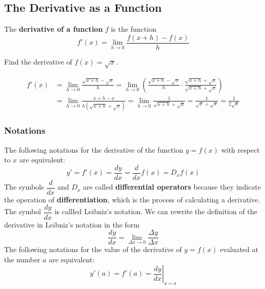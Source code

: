 \subsection{The Derivative as a Function}

\begin{definition}
    The \textbf{derivative of a function} \(f\) is the function
    \[f'(x)=\lim_{h\to 0}\frac{f(x+h)-f(x)}{h}\]
\end{definition}
\begin{problem}
    Find the derivative of \(f(x)=\sqrt{x}\).
\end{problem}
\begin{solution}
    \begin{align*}
        f'(x) &= \lim_{h\to 0}\frac{\sqrt{x+h}-\sqrt{x}}{h}=\lim_{h\to 0}
        \left(\frac{\sqrt{x+h}-\sqrt{x}}{h}\cdot
        \frac{\sqrt{x+h}+\sqrt{x}}{\sqrt{x+h}+\sqrt{x}}\right) \\
        &= \lim_{h\to 0}\frac{x+h-x}{h(\sqrt{x+h}+\sqrt{x})}
        =\lim_{h\to 0}\frac{1}{\sqrt{x+h}+\sqrt{x}}
        =\frac{1}{\sqrt{x}+\sqrt{x}}=\frac{1}{2\sqrt{x}} 
    \end{align*}
\end{solution}

\subsubsection*{Notations}
The following notations for the derivative of the function \(y=f(x)\) with
respect to \(x\) are equivalent:
\[y'=f'(x)=\frac{dy}{dx}=\frac{d}{dx}f(x)=D_x f(x)\]
The symbols \(\dfrac{d}{dx}\) and \(D_x\) are called \textbf{differential operators}
because they indicate the operation of \textbf{differentiation},
which is the process of calculating a derivative.
The symbol \(\dfrac{dy}{dx}\) is callled Leibniz's notation.
We can rewrite the definition of the derivative in Leibniz's notation in the
form
\[\frac{dy}{dx}=\lim_{\Delta x\to0}\frac{\Delta y}{\Delta x}\]
The following notations for the value of the derivative of \(y=f(x)\)
evaluated at the number \(a\) are equivalent:
\[y'(a)=f'(a)=\left.\frac{dy}{dx}\right|_{x=a}\]


